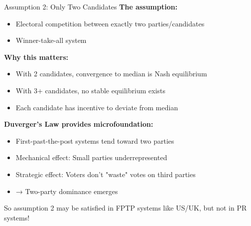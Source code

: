 \documentclass[10pt]{beamer}
\begin{document}
\begin{frame}{Assumption 2: Only Two Candidates}
\textbf{The assumption:}
\begin{itemize}
\item Electoral competition between exactly two parties/candidates
\item Winner-take-all system
\end{itemize}



\textbf{Why this matters:}
\begin{itemize}
\item With 2 candidates, convergence to median is Nash equilibrium
\item With 3+ candidates, \alert{no stable equilibrium exists}
\item Each candidate has incentive to deviate from median
\end{itemize}



\textbf{Duverger's Law provides microfoundation:}
\begin{itemize}
\item First-past-the-post systems tend toward two parties
\item Mechanical effect: Small parties underrepresented
\item Strategic effect: Voters don't "waste" votes on third parties
\item → Two-party dominance emerges
\end{itemize}



\alert{So assumption 2 may be satisfied in FPTP systems like US/UK, but not in PR systems!}
\end{frame}
\end{document}
